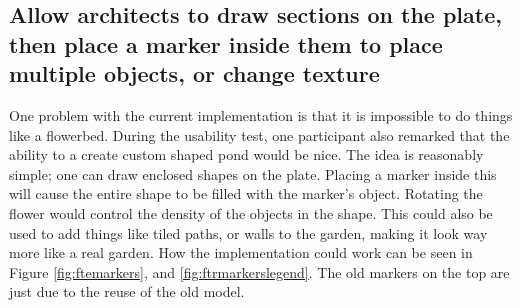 \subsection*{Allow architects to draw sections on the plate, then place a marker inside them to place multiple objects, or change texture}
One problem with the current implementation is that it is impossible to do things like a flowerbed. During the usability test, one participant also remarked that the ability to a create custom shaped pond would be nice. The idea is reasonably simple; one can draw enclosed shapes on the plate. Placing a marker inside this will cause the entire shape to be filled with the marker's object. Rotating the flower would control the density of the objects in the shape. This could also be used to add things like tiled paths, or walls to the garden, making it look way more like a real garden. How the implementation could work can be seen in Figure \ref{fig:ftemarkers}, and \ref{fig:ftrmarkerslegend}. The old markers on the top are just due to the reuse of the old model.
